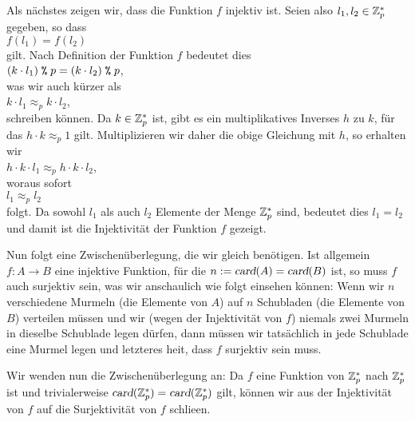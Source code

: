 Als n\"{a}chstes zeigen wir, dass die Funktion $f$ injektiv ist.  Seien also $l_1, l_2 \in \mathbb{Z}_{p}^*$
gegeben, so dass
\\[0.2cm]
\hspace*{1.3cm}
$f(l_1) = f(l_2)$
\\[0.2cm]
gilt.  Nach Definition der Funktion $f$ bedeutet dies
\\[0.2cm]
\hspace*{1.3cm}
$(k \cdot l_1) \;\texttt{\%}\; p = (k \cdot l_2) \;\texttt{\%}\; p$, 
\\[0.2cm]
was wir auch k\"{u}rzer als
\\[0.2cm]
\hspace*{1.3cm}
$k \cdot l_1 \approx_p k \cdot l_2$, 
\\[0.2cm]
schreiben k\"{o}nnen.  Da $k \in \mathbb{Z}_{p}^*$ ist, gibt es ein multiplikatives Inverses $h$ zu $k$, f\"{u}r das
$h \cdot k \approx_p 1$ gilt.  Multiplizieren wir daher die obige Gleichung mit $h$, so erhalten wir
\\[0.2cm]
\hspace*{1.3cm}
$h \cdot k \cdot l_1 \approx_p h \cdot k \cdot l_2$, 
\\[0.2cm] 
woraus sofort
\\[0.2cm]
\hspace*{1.3cm}
$l_1 \approx_p l_2$ 
\\[0.2cm]
folgt.  Da sowohl $l_1$ als auch $l_2$ Elemente der Menge $\mathbb{Z}_{p}^*$ sind, bedeutet dies $l_1 = l_2$ und
damit ist die Injektivit\"{a}t der Funktion $f$ gezeigt.
\vspace*{0.3cm}

Nun folgt eine Zwischen\"{u}berlegung, die wir gleich ben\"{o}tigen.
Ist allgemein $f: A \rightarrow B$ eine injektive Funktion, f\"{u}r die $n := \textsl{card}(A) = \textsl{card}(B)$ 
ist, so muss $f$ auch surjektiv sein, was wir anschaulich wie folgt einsehen k\"{o}nnen:
Wenn wir $n$ verschiedene Murmeln (die Elemente von $A$) auf $n$ Schubladen (die Elemente von $B$)
verteilen m\"{u}ssen und wir (wegen der Injektivit\"{a}t von $f$) niemals zwei Murmeln in dieselbe
Schublade legen d\"{u}rfen, dann m\"{u}ssen wir tats\"{a}chlich in jede Schublade eine Murmel legen und
letzteres hei\3t, dass $f$ surjektiv sein muss.
\vspace*{0.3cm}

Wir wenden nun die Zwischen\"{u}berlegung an:
Da $f$ eine Funktion von $\mathbb{Z}_{p}^*$ nach $\mathbb{Z}_{p}^*$ ist und trivialerweise $\textsl{card}(\mathbb{Z}_{p}^*)=\textsl{card}(\mathbb{Z}_{p}^*)$
gilt, k\"{o}nnen wir aus der Injektivit\"{a}t von $f$ auf die Surjektivit\"{a}t von $f$ schlie\3en.
\vspace*{0.2cm}

